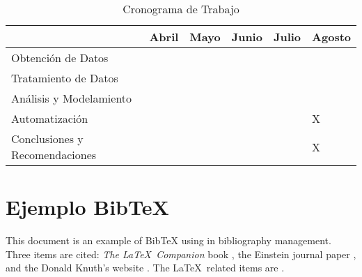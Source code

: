 \documentclass[10pt,a5paper]{article}
\begin{document}
\begin{table}[h!]
\centering
\label{Cronograma}
\begin{tabular}{|m{2.5cm} *{5}{|m{0.95cm}}|}
\hline
       & Abril   & Mayo   & Junio   & Julio & Agosto  \\ \hline
Obtención de Datos   &   &   &   &  &  \\ \hline
Tratamiento de Datos  &   &   &   &  &  \\ \hline
Análisis y Modelamiento &   &  &   &  &  \\ \hline
Automatización  &   &   &   &  & X \\ \hline
Conclusiones y Recomendaciones  &   &   &   &  & X \\ 

\hline
\end{tabular}
\caption{Cronograma de Trabajo}
\end{table}



\section{Ejemplo BibTeX}
This document is an example of BibTeX using in bibliography management. Three items are cited: \textit{The \LaTeX\ Companion} book \cite{latexcompanion}, the Einstein journal paper \cite{einstein}, and the Donald Knuth's website \cite{knuthwebsite}. The \LaTeX\ related items are \cite{latexcompanion,knuthwebsite}. 



\end{document}
